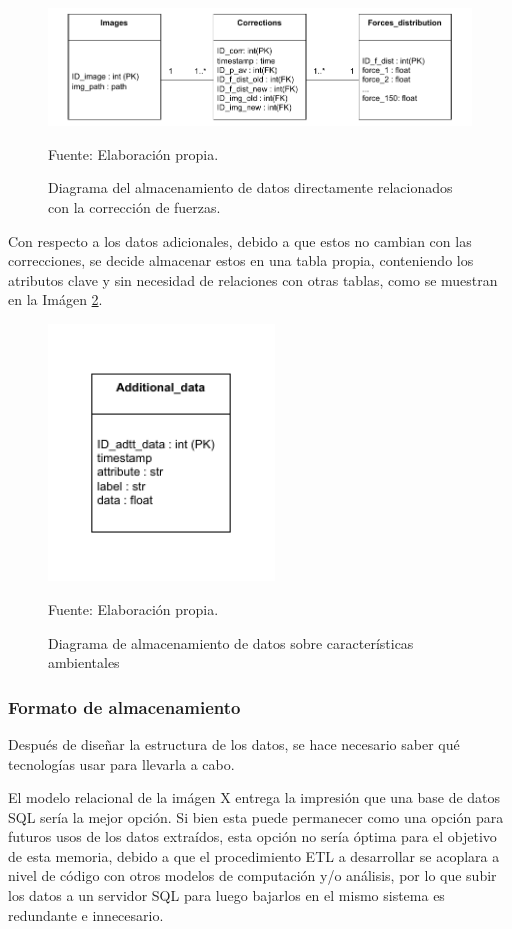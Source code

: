 \begin{figure}[h]
\centering
\includegraphics{figures/db_diagram_corr}
\caption{\label{fig:db_corr} Diagrama del almacenamiento de datos directamente relacionados con la corrección de fuerzas.} Fuente: Elaboración propia.
\end{figure}

Con respecto a los datos adicionales, debido a que estos no cambian con las correcciones, se decide almacenar estos en una tabla propia, conteniendo los atributos clave y sin necesidad de relaciones con otras tablas, como se muestran en la Imágen \ref{fig:db_add_data}.

\begin{figure}[h]
\centering
\includegraphics[width=6cm]{figures/db_diagram_add_data}
\caption{\label{fig:db_add_data} Diagrama de almacenamiento de datos sobre características ambientales} Fuente: Elaboración propia.
\end{figure}

\subsubsection{Formato de almacenamiento}

Después de diseñar la estructura de los datos, se hace necesario saber qué tecnologías usar para llevarla a cabo.

El modelo relacional de la imágen X entrega la impresión que una base de datos SQL sería la mejor opción. Si bien esta puede permanecer como una opción para futuros usos de los datos extraídos, esta opción no sería óptima para el objetivo de esta memoria, debido a que el procedimiento ETL a desarrollar se acoplara a nivel de código con otros modelos de computación y/o análisis, por lo que subir los datos a un servidor SQL para luego bajarlos en el mismo sistema es redundante e innecesario.

